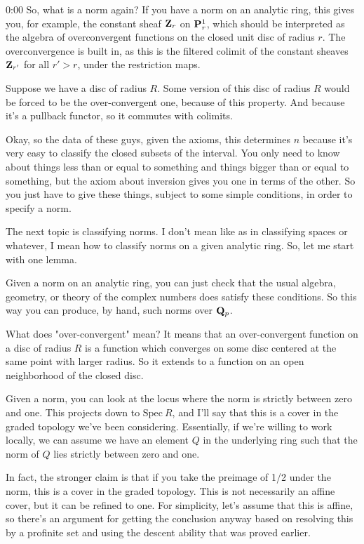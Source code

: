\begin{unfinished}{0:00}
So, what is a norm again? If you have a norm on an analytic ring, this gives you, for example, the constant sheaf $\Z_{r}$ on $\P^1_r$, which should be interpreted as the algebra of overconvergent functions on the closed unit disc of radius $r$. The overconvergence is built in, as this is the filtered colimit of the constant sheaves $\Z_{r'}$ for all $r' > r$, under the restriction maps.



Suppose we have a disc of radius $R$. Some version of this disc of radius $R$ would be forced to be the over-convergent one, because of this property. And because it's a pullback functor, so it commutes with colimits.

Okay, so the data of these guys, given the axioms, this determines $n$ because it's very easy to classify the closed subsets of the interval. You only need to know about things less than or equal to something and things bigger than or equal to something, but the axiom about inversion gives you one in terms of the other. So you just have to give these things, subject to some simple conditions, in order to specify a norm.

The next topic is classifying norms. I don't mean like as in classifying spaces or whatever, I mean how to classify norms on a given analytic ring. So, let me start with one lemma.

Given a norm on an analytic ring, you can just check that the usual algebra, geometry, or theory of the complex numbers does satisfy these conditions. So this way you can produce, by hand, such norms over $\Q_p$.

What does "over-convergent" mean? It means that an over-convergent function on a disc of radius $R$ is a function which converges on some disc centered at the same point with larger radius. So it extends to a function on an open neighborhood of the closed disc.

Given a norm, you can look at the locus where the norm is strictly between zero and one. This projects down to $\mathrm{Spec}\ R$, and I'll say that this is a cover in the graded topology we've been considering. Essentially, if we're willing to work locally, we can assume we have an element $Q$ in the underlying ring such that the norm of $Q$ lies strictly between zero and one.

In fact, the stronger claim is that if you take the preimage of 1/2 under the norm, this is a cover in the graded topology. This is not necessarily an affine cover, but it can be refined to one. For simplicity, let's assume that this is affine, so there's an argument for getting the conclusion anyway based on resolving this by a profinite set and using the descent ability that was proved earlier.


\end{unfinished}

